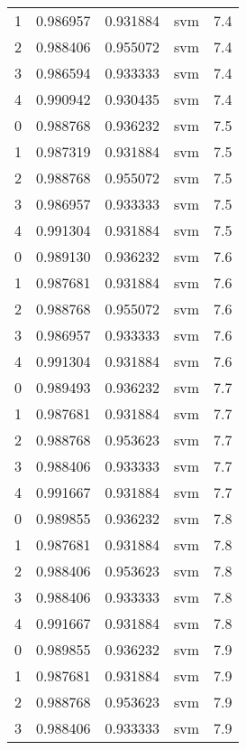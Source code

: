 \begin{tabular}{rrrlr}
     1 & 0.986957 & 0.931884 &      svm &        7.4 \\
     2 & 0.988406 & 0.955072 &      svm &        7.4 \\
     3 & 0.986594 & 0.933333 &      svm &        7.4 \\
     4 & 0.990942 & 0.930435 &      svm &        7.4 \\
     0 & 0.988768 & 0.936232 &      svm &        7.5 \\
     1 & 0.987319 & 0.931884 &      svm &        7.5 \\
     2 & 0.988768 & 0.955072 &      svm &        7.5 \\
     3 & 0.986957 & 0.933333 &      svm &        7.5 \\
     4 & 0.991304 & 0.931884 &      svm &        7.5 \\
     0 & 0.989130 & 0.936232 &      svm &        7.6 \\
     1 & 0.987681 & 0.931884 &      svm &        7.6 \\
     2 & 0.988768 & 0.955072 &      svm &        7.6 \\
     3 & 0.986957 & 0.933333 &      svm &        7.6 \\
     4 & 0.991304 & 0.931884 &      svm &        7.6 \\
     0 & 0.989493 & 0.936232 &      svm &        7.7 \\
     1 & 0.987681 & 0.931884 &      svm &        7.7 \\
     2 & 0.988768 & 0.953623 &      svm &        7.7 \\
     3 & 0.988406 & 0.933333 &      svm &        7.7 \\
     4 & 0.991667 & 0.931884 &      svm &        7.7 \\
     0 & 0.989855 & 0.936232 &      svm &        7.8 \\
     1 & 0.987681 & 0.931884 &      svm &        7.8 \\
     2 & 0.988406 & 0.953623 &      svm &        7.8 \\
     3 & 0.988406 & 0.933333 &      svm &        7.8 \\
     4 & 0.991667 & 0.931884 &      svm &        7.8 \\
     0 & 0.989855 & 0.936232 &      svm &        7.9 \\
     1 & 0.987681 & 0.931884 &      svm &        7.9 \\
     2 & 0.988768 & 0.953623 &      svm &        7.9 \\
     3 & 0.988406 & 0.933333 &      svm &        7.9 \\

\end{tabular}
